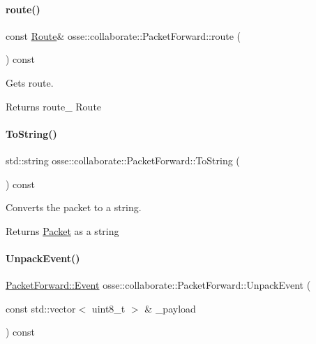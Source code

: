 \paragraph{\texorpdfstring{route()}{route()}}
{\footnotesize\ttfamily const \hyperlink{classosse_1_1collaborate_1_1_packet_forward_a5b42a7c3605c5a6c7e0880599b213240}{Route}\& osse\+::collaborate\+::\+Packet\+Forward\+::route (\begin{DoxyParamCaption}{ }\end{DoxyParamCaption}) const\hspace{0.3cm}{\ttfamily [inline]}}



Gets route. 

\begin{DoxyReturn}{Returns}
route\+\_\+ Route 
\end{DoxyReturn}
\mbox{\label{classosse_1_1collaborate_1_1_packet_forward_ab1bc40a24079aac6e1ee579e76b6e4a3}} 
\paragraph{\texorpdfstring{To\+String()}{ToString()}}
{\footnotesize\ttfamily std\+::string osse\+::collaborate\+::\+Packet\+Forward\+::\+To\+String (\begin{DoxyParamCaption}{ }\end{DoxyParamCaption}) const}



Converts the packet to a string. 

\begin{DoxyReturn}{Returns}
\hyperlink{classosse_1_1collaborate_1_1_packet}{Packet} as a string 
\end{DoxyReturn}
\mbox{\label{classosse_1_1collaborate_1_1_packet_forward_a954b32499a8ca1e5d68da03b567dc2e3}} 
\paragraph{\texorpdfstring{Unpack\+Event()}{UnpackEvent()}}
{\footnotesize\ttfamily \hyperlink{classosse_1_1collaborate_1_1_packet_forward_a66c37a806c4b486cb1af64409865fa4b}{Packet\+Forward\+::\+Event} osse\+::collaborate\+::\+Packet\+Forward\+::\+Unpack\+Event (\begin{DoxyParamCaption}\item[{const std\+::vector$<$ uint8\+\_\+t $>$ \&}]{\+\_\+payload }\end{DoxyParamCaption}) const\hspace{0.3cm}{\ttfamily [private]}}



